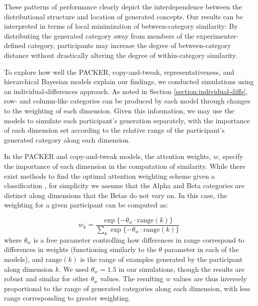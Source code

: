 \documentclass[12pt]{article}
\begin{document}
\begin{flushleft}
These patterns of performance clearly depict the interdependence between the
distributional structure and location of generated concepts. Our results can be
interpreted in terms of local minimization of between-category similarity: By
distributing the generated category away from members of the
experimenter-defined category, participants may increase the degree of
between-category distance without drastically altering the degree of
within-category similarity.

To explore how well the PACKER, copy-and-tweak, representativeness, and
hierarchical Bayesian models explain our findings, we conducted simulations
using an individual-differences approach. As noted in Section
\ref{section:individual-diffs}, row- and column-like categories can be produced
by each model through changes to the weighting of each dimension. Given this
information, we may use the models to simulate each participant's generation
separately, with the importance of each dimension set according to the relative
range of the participant's generated category along each dimension.

In the PACKER and copy-and-tweak models, the attention weights, $w$, specify the
importance of each dimension in the computation of similarity. While there exist
methods to find the optimal attention weighting scheme given a classification
\citep[see][]{vanpaemel2012using}, for simplicity we assume that the Alpha
and Beta categories are distinct along dimensions that the Betas do not vary on.
In this case, the weighting for a given participant can be computed as:

\begin{equation} w_k = \dfrac {\exp{ \{ -\theta_w \cdot\text{range}(k)} \} } {
\sum_k {\exp{ \{ -\theta_w \cdot\text{range}(k)} \} } }
\label{eq:range-weight}
\end{equation}
% 
where $\theta_w$ is a free parameter controlling how differences in range
correspond to differences in weights (functioning similarly to the $\theta$
parameter in each of the models), and $\text{range}(k)$ is the range of examples
generated by the participant along dimension $k$. We used $\theta_w = 1.5$ in
our simulations, though the results are robust and similar for other $\theta_w$
values. The resulting $w$ values are thus inversely proportional to the range of
generated categories along each dimension, with less range corresponding to
greater weighting.


\end{flushleft}
\end{document}
